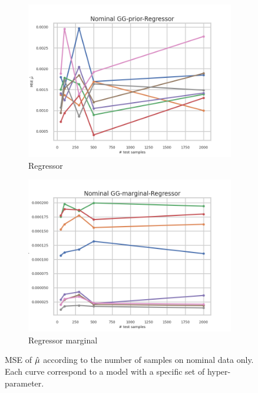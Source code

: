 \begin{figure}[ht!]
  \begin{subfigure}[t]{0.49\linewidth}
    \includegraphics[width=\linewidth]{COMPARE/GG-prior/Regressor/profusion_nominal_n_samples_mse.png}
    \caption{Regressor}
  \end{subfigure}%
  \hfill
  \begin{subfigure}[t]{0.49\linewidth}
    \includegraphics[width=\linewidth]{COMPARE/GG-marginal/Regressor/profusion_nominal_n_samples_mse.png}
    \caption{Regressor marginal}
  \end{subfigure}


  \caption{MSE of $\hat\mu$ according to the number of samples on nominal data only. Each curve correspond to a model with a specific set of hyper-parameter.}
  \label{fig:gg_baseline_nominal_n_samples_mse}
\end{figure}


